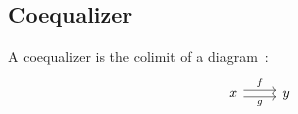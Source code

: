 \subsection{Coequalizer}

\begin{definition}[Coequalizer]

  A coequalizer is the colimit of a
  diagram~\parencite[p.~128]{leinster:basic_category_theory}:
  \[\begin{tikzcd}[ampersand replacement=\&]
    x \& y
    \arrow["f", shift left=1, from=1-1, to=1-2]
    \arrow["g"', shift right=1, from=1-1, to=1-2]
  \end{tikzcd}\]
\end{definition}